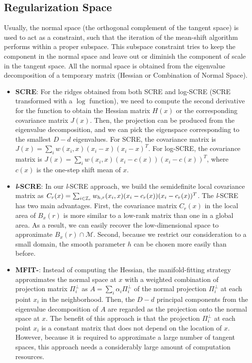 \documentclass[aos,preprint]{imsart}
\theoremstyle{remark}
\begin{document}
\begin{appendix}
\subsection{Regularization Space}
Usually, the normal space (the orthogonal complement of the tangent space) is used to act as a constraint, such that the iteration of the mean-shift algorithm performs within a proper subspace. This subspace constraint tries to keep the component in the normal space and leave out or diminish the component of scale in the tangent space. All the normal space is obtained from the eigenvalue decomposition of a temporary matrix (Hessian or Combination of Normal Space).
\begin{itemize}
\item{\bf SCRE}:  For the ridges obtained from both SCRE and {log}-SCRE (SCRE transformed with a $\log$ function), we need to compute the second derivative for the function to obtain the Hessian matrix $H(x)$ or the corresponding covariance matrix $J(x)$. Then, the projection can be produced from the eigenvalue decomposition, and we can pick the eigenspace corresponding to the smallest $D-d$ eigenvalues. For SCRE, the covariance matrix is $J(x) = \sum_i w(x_i,x)(x_i-x)(x_i-x)^T$. For {log}-SCRE, the covariance matrix is $J(x) = \sum_i w(x_i,x)(x_i-c(x))(x_i-c(x))^T$, where $c(x)$ is the one-step shift mean of $x$.

\item{\bf {\it l}-SCRE}: In our {\it l}-SCRE approach, we build the semidefinite local covariance matrix as $C_{r}(x)=\sum_{i\in {\cal I}_r} w_{h,r}(x_i, x)(x_i-c_r(x))(x_i-c_r(x))^T$. The {\it l}-SCRE has two main advantages. First, the covariance matrix $C_{r}(x)$ in the local area of $B_{{x}}(r)$ is more similar to a low-rank matrix than one in a global area. As a result, we can easily recover the low-dimensional space to approximate $B_{{x}}(r)\cap \mathcal M$. Second, because we restrict our consideration to a small domain, the smooth parameter $h$ can be chosen more easily than before.

\item{\bf MFIT-}: Instead of computing the Hessian, the manifold-fitting strategy \cite{fefferman2018fitting}  approximates the normal space at ${x}$ with a weighted combination of projection matrix $\Pi_i^{\perp}$ as $A = \sum_i \alpha_i \Pi_i^{\perp}$ of the normal projection $\Pi_i^{\perp}$ at each point $x_i$ in the neighborhood. Then, the $D-d$ principal components from the eigenvalue decomposition of $A$ are regarded as the projection onto the normal space at ${x}$. The benefit of this approach is that the projection $\Pi_i^{\perp}$ at each point $x_i$ is a constant matrix that does not depend on the location of ${x}$. However, because it is required to approximate a large number of tangent spaces, this approach needs a considerably large amount of computation resources.


\end{itemize}
\end{appendix}
\end{document}
